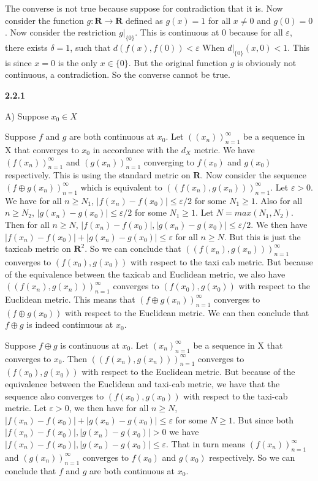 \documentclass[12pt]{article}
\begin{document}
The converse is not true because suppose for contradiction that it is. Now consider the function $g: \textbf{R}\to \textbf{R}$ defined as $ g(x) = 1$ for all $x\neq 0$ and $g(0) = 0$. Now consider the restriction $g|_{\{0\}}$. This is continuous at $0$ because for all $\varepsilon$, there exists $\delta= 1$, such that $d(f(x), f(0)) < \varepsilon$ When $d|_{\{0\}}(x,0)< 1$. This is since $x=0$ is the only $x\in \{0\}$. But the original function $g$ is obviously not continuous, a contradiction. So the converse cannot be true. 

\textbf{2.2.1}

A) Suppose $x_0\in X$

Suppose $f$ and $g$ are both continuous at $x_0$. Let $((x_n))_{n=1}^\infty$ be a sequence in X that converges to $x_0$ in accordance with the $d_X$ metric. We have $(f(x_n))_{n=1}^\infty$ and $(g(x_n))_{n=1}^\infty$ converging to $f(x_0)$ and $g(x_0)$ respectively. This is using the standard metric on $\textbf{R}$. Now consider the sequence $(f\oplus g(x_n))_{n=1}^\infty$ which is equivalent to $((f(x_n),g(x_n)))_{n=1}^\infty$. Let $\varepsilon>0$. We have for all $n\geq N_1$, $|f(x_n)-f(x_0)|\leq \varepsilon/2 $ for some $N_1\geq 1$. Also for all $n\geq N_2$, $|g(x_n)-g(x_0)|\leq \varepsilon/2 $ for some $N_1\geq 1$. Let $N = max(N_1, N_2)$. Then for all $n\geq N$, $|f(x_n)-f(x_0)|,|g(x_n)-g(x_0)|\leq \varepsilon/2$. We then have $|f(x_n)-f(x_0)|+|g(x_n)-g(x_0)|\leq \varepsilon$ for all $n\geq N$. But this is just the taxicab metric on $\textbf{R}^2$. So we can conclude that $((f(x_n),g(x_n)))_{n=1}^\infty$ converges to $(f(x_0),g(x_0))$ with respect to the taxi cab metric. But because of the equivalence between the taxicab and Euclidean metric, we also have $((f(x_n),g(x_n)))_{n=1}^\infty$ converges to $(f(x_0),g(x_0))$ with respect to the Euclidean metric. This means that $(f\oplus g(x_n))_{n=1}^\infty$ converges to $(f\oplus g(x_0))$ with respect to the Euclidean metric. We can then conclude that $f\oplus g$ is indeed continuous at $x_0$. 

Suppose $f\oplus g$ is continuous at $x_0$. Let $(x_n)^\infty_{n=1}$ be a sequence in X that converges to $x_0$. Then $((f(x_n),g(x_n)))^\infty_{n=1}$ converges to $(f(x_0),g(x_0))$ with respect to the Euclidean metric. But because of the equivalence between the Euclidean and taxi-cab metric, we have that the sequence also converges to $(f(x_0),g(x_0))$ with respect to the taxi-cab metric. Let $\varepsilon >0$, we then have for all $n\geq N$, $|f(x_n)-f(x_0)| +|g(x_n)-g(x_0)| \leq \varepsilon$ for some $N\geq 1$. But since both $|f(x_n)-f(x_0)|,|g(x_n)-g(x_0)|>0 $ we have $|f(x_n)-f(x_0)|,|g(x_n)-g(x_0)|\leq \varepsilon$. That in turn means $(f(x_n))^\infty_{n=1}$ and $(g(x_n))^\infty_{n=1}$ converges to $f(x_0)$ and $g(x_0)$ respectively. So we can conclude that $f$ and $g$ are both continuous at $x_0$.
\end{document}

